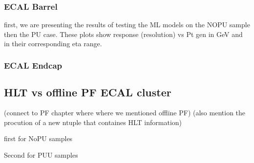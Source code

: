 \subsubsection{ECAL Barrel}
first, we are presenting the results of testing the ML models on the NOPU sample then the PU case.
These plots show response (resolution) vs Pt gen in GeV and in their corresponding eta range.





\subsubsection{ECAL Endcap}






\subsection{HLT vs offline PF ECAL cluster}

(connect to PF chapter where where we mentioned offline PF)
(also mention the procution of a new ntuple that containes HLT information) 

first for NoPU samples

Second for PUU samples

